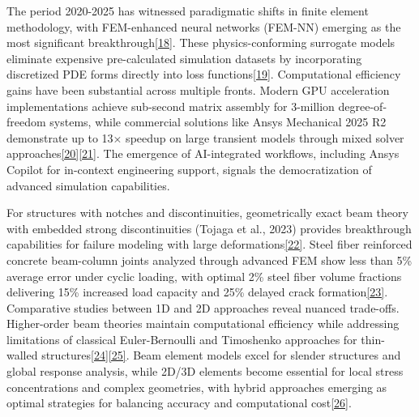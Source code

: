 \documentclass[12pt,a4paper]{report}
\begin{document}
The period 2020-2025 has witnessed paradigmatic shifts in finite element methodology, with FEM-enhanced neural networks (FEM-NN) emerging as the most significant breakthrough\href{https://www.sciencedirect.com/science/article/pii/S2352012422000947}{[18]}. These physics-conforming surrogate models eliminate expensive pre-calculated simulation datasets by incorporating discretized PDE forms directly into loss functions\href{https://amses-journal.springeropen.com/articles/10.1186/s40323-023-00243-1}{[19]}. Computational efficiency gains have been substantial across multiple fronts. Modern GPU acceleration implementations achieve sub-second matrix assembly for 3-million degree-of-freedom systems, while commercial solutions like Ansys Mechanical 2025 R2 demonstrate up to 13× speedup on large transient models through mixed solver approaches\href{https://onlinelibrary.wiley.com/doi/pdf/10.1002/nme.6383}{[20]}\href{https://metavo.metacentrum.cz/export/sites/meta/cs/seminars/seminar5/Ansys-SVSFEM.pdf}{[21]}. The emergence of AI-integrated workflows, including Ansys Copilot for in-context engineering support, signals the democratization of advanced simulation capabilities. 

For structures with notches and discontinuities, geometrically exact beam theory with embedded strong discontinuities (Tojaga et al., 2023) provides breakthrough capabilities for failure modeling with large deformations\href{https://www.sciencedirect.com/science/article/pii/S0045782523001378}{[22]}. Steel fiber reinforced concrete beam-column joints analyzed through advanced FEM show less than 5\% average error under cyclic loading, with optimal 2\% steel fiber volume fractions delivering 15\% increased load capacity and 25\% delayed crack formation\href{https://www.nature.com/articles/s41598-024-69270-1}{[23]}. Comparative studies between 1D and 2D approaches reveal nuanced trade-offs. Higher-order beam theories maintain computational efficiency while addressing limitations of classical Euler-Bernoulli and Timoshenko approaches for thin-walled structures\href{https://www.sciencedirect.com/science/article/pii/S2352012420303854}{[24]}\href{https://www.sciencedirect.com/science/article/pii/S0020740322000649#sec0015}{[25]}. Beam element models excel for slender structures and global response analysis, while 2D/3D elements become essential for local stress concentrations and complex geometries, with hybrid approaches emerging as optimal strategies for balancing accuracy and computational cost\href{Cook, R. D., Malkus, D. S., Plesha, M. E., & Witt, R. J. (2001). Concepts and Applications of Finite Element Analysis (4th ed.). John Wiley & Sons.}{[26]}.
\end{document}
